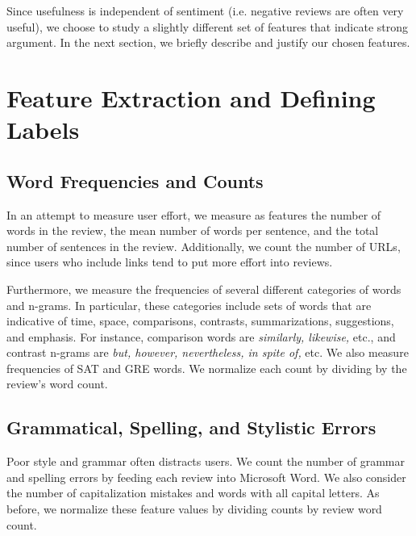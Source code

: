 \documentclass[letterpaper]{article}
\begin{document}
Since usefulness is independent of sentiment (i.e. negative reviews are often
very useful), we choose to study a slightly different set of features that
indicate strong argument. In the next section, we briefly describe and justify
our chosen features.

\section{Feature Extraction and Defining Labels}
\label{sec:features}

\subsection{Word Frequencies and Counts}
In an attempt to measure user effort, we measure as features the number of 
words in the review, the mean number of words per sentence, and the total 
number of sentences in the review. Additionally, we count the number of URLs, 
since users who include links tend to put more effort into reviews.

Furthermore, we measure the frequencies of several different categories of 
words and n-grams.  In particular, these categories include sets of words that
are indicative of time, space, comparisons, contrasts, summarizations,
suggestions, and emphasis.  For instance, comparison words are \emph{similarly,
likewise,} etc., and contrast n-grams are \emph{but, however, nevertheless, 
in spite of,} etc. We also measure frequencies of SAT and GRE words.  We 
normalize each count by dividing by the review's word count.

\subsection{Grammatical, Spelling, and Stylistic Errors}
Poor style and grammar often distracts users.  We count the number of grammar 
and spelling errors by feeding each review into Microsoft Word. We also 
consider the number of capitalization mistakes and words with all capital 
letters. As before, we normalize these feature values by dividing
counts by review word count.
\end{document}
